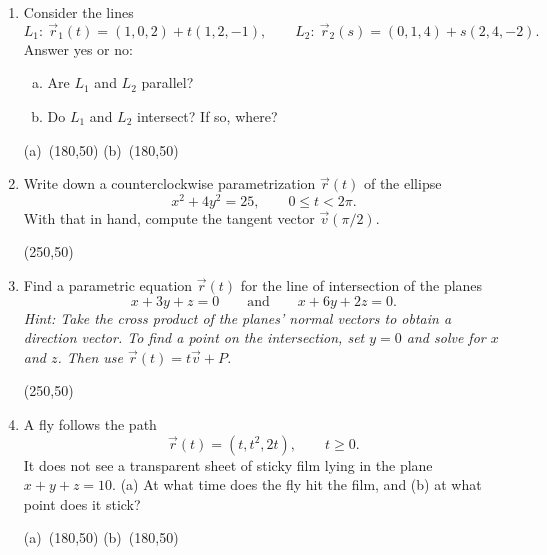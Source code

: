 \documentclass[12pt]{exam}
\begin{document}
\begin{enumerate}

\item Consider the lines
\[
  L_1:\ \vec{r}_1(t)=(1,0,2)+t(1,2,-1),\qquad
  L_2:\ \vec{r}_2(s)=(0,1,4)+s(2,4,-2).
\]
Answer yes or no:
\begin{enumerate}[(a)]
  \item Are $L_1$ and $L_2$ parallel?
  \item Do $L_1$ and $L_2$ intersect? If so, where?
\end{enumerate}

\vfill
\begin{flushright}
(a)\ \framebox(180,50){}\qquad
(b)\ \framebox(180,50){}
\end{flushright}

\item Write down a counterclockwise parametrization
$\vec{r}(t)$ of the ellipse
\[
  {x^2}+4y^2=25,\qquad 0\leq t< 2\pi.
\]
With that in hand, compute the tangent vector $\vec{v}(\pi/2)$.

\vfill
\begin{flushright}
\framebox(250,50){}
\end{flushright}

\newpage

\item Find a parametric equation $\vec{r}(t)$ for the line of intersection
of the planes
\[
  x+3y+z=0
  \qquad\text{and}\qquad
  x+6y+2z=0.
\]
\textit{Hint: Take the cross product of the planes' normal vectors to obtain
a direction vector. To find a point on the intersection, set $y=0$ and solve
for $x$ and $z$. Then use $\vec{r}(t)=t\vec{v}+P$.}

\vfill
\begin{flushright}
\framebox(250,50){}
\end{flushright}

\item A fly follows the path
\[
  \vec{r}(t)=(t,t^2,2t),\qquad t\geq 0.
\]
It does not see a transparent sheet of sticky film lying in the plane
$x+y+z=10$. (a) At what time does the fly hit the film, and (b) at what point does it
stick?

\vfill
\begin{flushright}
(a)\ \framebox(180,50){}\qquad
(b)\ \framebox(180,50){}
\end{flushright}

\end{enumerate}
\end{document}
